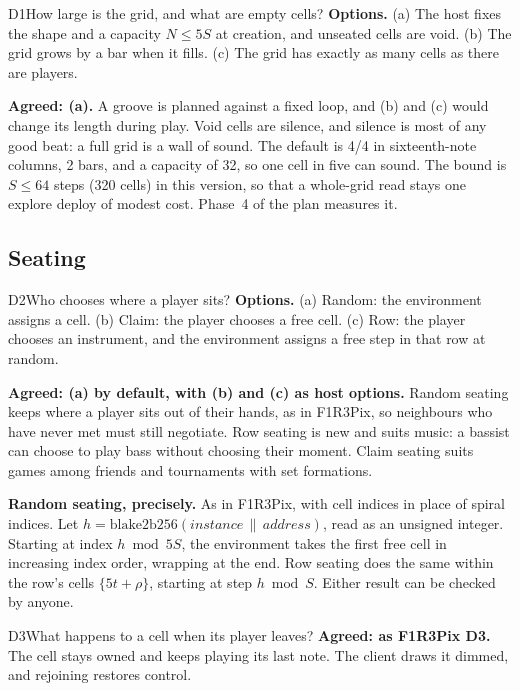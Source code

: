 \documentclass[11pt,a4paper]{article}
\begin{document}
\begin{decision}{D1}{How large is the grid, and what are empty cells?}
\textbf{Options.} (a) The host fixes the shape and a capacity $N\le 5S$ at creation, and
unseated cells are void. (b) The grid grows by a bar when it fills. (c) The grid has exactly as
many cells as there are players.

\textbf{Agreed: (a).} A groove is planned against a fixed loop, and (b) and (c) would
change its length during play. Void cells are silence, and silence is most of any good beat:
a full grid is a wall of sound. The default is 4/4 in sixteenth-note columns, 2 bars, and a capacity of 32, so one cell in
five can sound. The bound is $S\le 64$ steps (320 cells) in this version, so that a whole-grid
read stays one explore deploy of modest cost. Phase~4 of the plan measures it.
\end{decision}

\subsection{Seating}

\begin{decision}{D2}{Who chooses where a player sits?}
\textbf{Options.} (a) Random: the environment assigns a cell. (b) Claim: the player chooses a
free cell. (c) Row: the player chooses an instrument, and the environment assigns a free step in
that row at random.

\textbf{Agreed: (a) by default, with (b) and (c) as host options.} Random seating
keeps where a player sits out of their hands, as in F1R3Pix, so neighbours who have never met
must still negotiate. Row seating is new and suits music: a bassist can choose to play bass
without choosing their moment. Claim seating suits games among friends and tournaments with set
formations.

\textbf{Random seating, precisely.} As in F1R3Pix, with cell indices in place of spiral indices.
Let $h=\mathrm{blake2b256}(\mathit{instance}\,\|\,\mathit{address})$, read as an unsigned
integer. Starting at index $h\bmod 5S$, the environment takes the first free cell in
increasing index order, wrapping at the end. Row seating does the same within the row's cells
$\{5t+\rho\}$, starting at step $h\bmod S$. Either result can be checked by anyone.
\end{decision}

\begin{decision}{D3}{What happens to a cell when its player leaves?}
\textbf{Agreed: as F1R3Pix D3.} The cell stays owned and keeps playing its last note.
The client draws it dimmed, and rejoining restores control.
\end{decision}
\end{document}
